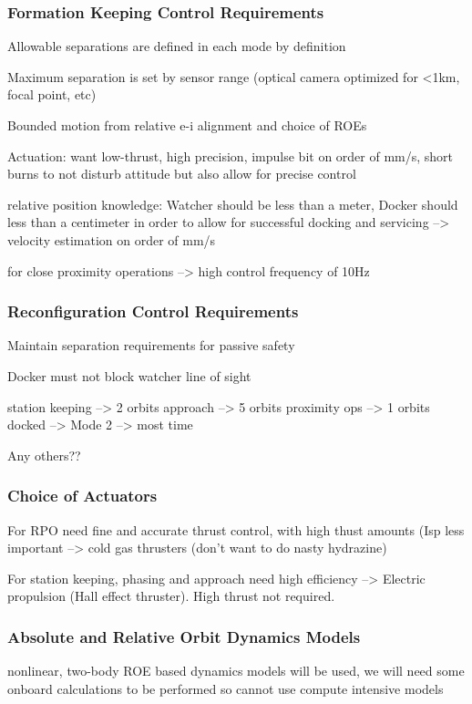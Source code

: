 \subsubsection{Formation Keeping Control Requirements}
Allowable separations are defined in each mode by definition

Maximum separation is set by sensor range (optical camera optimized for <1km, focal point, etc)

Bounded motion from relative e-i alignment and choice of ROEs

Actuation: want low-thrust, high precision, impulse bit on order of mm/s, short burns to not disturb attitude but also allow for precise control

relative position knowledge: Watcher should be less than a meter, Docker should less than a centimeter in order to allow for successful docking and servicing --> velocity estimation on order of mm/s

for close proximity operations --> high control frequency of 10Hz



\subsubsection{Reconfiguration Control Requirements}
Maintain separation requirements for passive safety

Docker must not block watcher line of sight

station keeping --> 2 orbits
approach --> 5 orbits
proximity ops --> 1 orbits
docked --> 
Mode 2 --> most time

Any others??


\subsubsection{Choice of Actuators}
For RPO need fine and accurate thrust control, with high thust amounts (Isp less important --> cold gas thrusters (don't want to do nasty hydrazine)

For station keeping, phasing and approach need high efficiency --> Electric propulsion (Hall effect thruster). High thrust not required.



\subsubsection{Absolute and Relative Orbit Dynamics Models}
nonlinear, two-body ROE based dynamics models will be used, we will need some onboard calculations to be performed so cannot use compute intensive models

